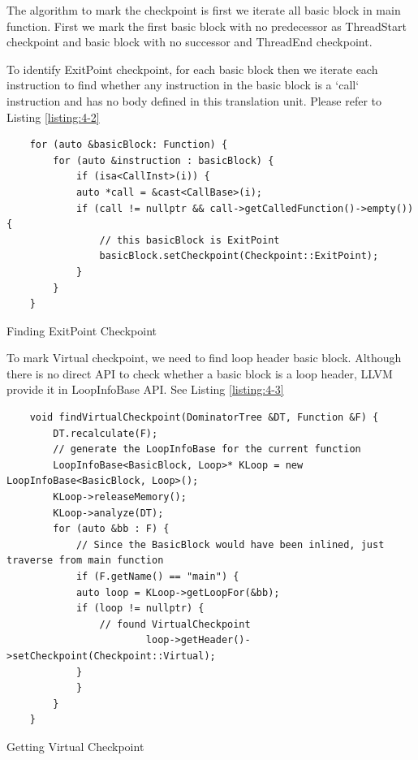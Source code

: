 The algorithm to mark the checkpoint is first we iterate all basic block in main function. First we mark the first basic block with no predecessor as ThreadStart checkpoint and basic block with no successor and ThreadEnd checkpoint. 

To identify ExitPoint checkpoint, for each basic block then we iterate  each instruction to find whether any instruction in the basic block is a `call` instruction and has no body defined in this translation unit. Please refer to Listing \ref{listing:4-2}

\begin{listing}
\begin{verbatim}
    for (auto &basicBlock: Function) {
        for (auto &instruction : basicBlock) {
            if (isa<CallInst>(i)) {
            auto *call = &cast<CallBase>(i);
            if (call != nullptr && call->getCalledFunction()->empty()) {
                // this basicBlock is ExitPoint
                basicBlock.setCheckpoint(Checkpoint::ExitPoint);
            } 
        }
    } 
\end{verbatim}
\caption{Finding ExitPoint Checkpoint}    
\label{listing:4-2}
\end{listing}

To mark Virtual checkpoint, we need to find loop header basic block. Although there is no direct API to check whether a basic block is a loop header, LLVM provide it in LoopInfoBase API. See Listing \ref{listing:4-3}

\begin{listing}
\begin{verbatim}
    void findVirtualCheckpoint(DominatorTree &DT, Function &F) {
        DT.recalculate(F);
        // generate the LoopInfoBase for the current function
        LoopInfoBase<BasicBlock, Loop>* KLoop = new LoopInfoBase<BasicBlock, Loop>();
        KLoop->releaseMemory();
        KLoop->analyze(DT);
        for (auto &bb : F) {
            // Since the BasicBlock would have been inlined, just traverse from main function
            if (F.getName() == "main") {
            auto loop = KLoop->getLoopFor(&bb);
            if (loop != nullptr) {
                // found VirtualCheckpoint
                        loop->getHeader()->setCheckpoint(Checkpoint::Virtual);
            }
            }
        }
    }
\end{verbatim}
\caption{Getting Virtual Checkpoint }    
\label{listing:4-3}
\end{listing}

